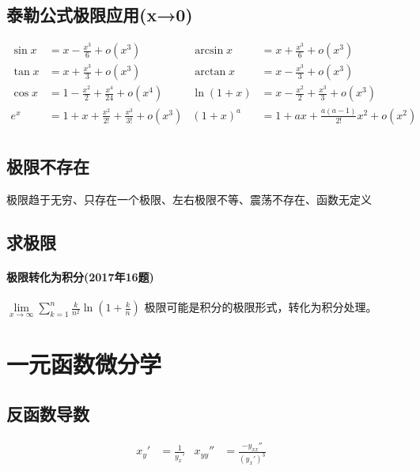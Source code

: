 ﻿\documentclass[a4paper,12pt,UTF8]{ctexart}
\begin{document}
    \subsection{泰勒公式极限应用(x→0)}
    \begin{align*}
        \sin x& = x - \frac{x^{3}}{6} + o(x^{3})& \arcsin x& = x + \frac{x^{3}}{6} + o(x^{3})&\\
        \tan x& = x + \frac{x^{3}}{3} + o(x^{3})& \arctan x& = x - \frac{x^{3}}{3} + o(x^{3})&\\
        \cos x& = 1 - \frac{x^{2}}{2} + \frac{x^{4}}{24} + o(x^{4})& \ln (1+x)& = x - \frac{x^{2}}{2} + \frac{x^{3}}{3} + o(x^{3})&\\
        e^x& = 1 + x + \frac{x^{2}}{2!} + \frac{x^{3}}{3!} + o(x^{3})& (1+x)^{a}& = 1 + ax + \frac{a(a-1)}{2!}x^{2} + o(x^{2})&\\
    \end{align*}

    \subsection{极限不存在}
    极限趋于无穷、只存在一个极限、左右极限不等、震荡不存在、函数无定义    

    \subsection{求极限}

    \paragraph{极限转化为积分(2017年16题)} \(\lim \limits_{x \to \infty} \sum \limits_{k=1}^{n}\frac{k}{n^2}\ln (1+ \frac{k}{n}) \)  极限可能是积分的极限形式，转化为积分处理。

    \section{一元函数微分学}

    \subsection{反函数导数}
    \begin{align*}
        x_y'& = \frac{1}{y_x'}& x_{yy}''& = \frac{-y_{xx}''}{(y_x')^{3}}&\\
    \end{align*}
\end{document}
